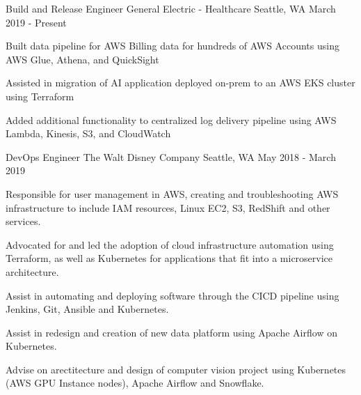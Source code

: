 

\begin{cventries}

  \cventry
    {Build and Release Engineer} %
    {General Electric - Healthcare} %
    {Seattle, WA} %
    {March 2019 - Present} %
    {
      \begin{cvitems} %
        \item {Built data pipeline for AWS Billing data for hundreds of AWS Accounts using AWS Glue, Athena, and QuickSight}
        \item {Assisted in migration of AI application deployed on-prem to an AWS EKS cluster using Terraform}
        \item {Added additional functionality to centralized log delivery pipeline using AWS Lambda, Kinesis, S3, and CloudWatch}
      \end{cvitems}
    }

  \cventry
    {DevOps Engineer} %
    {The Walt Disney Company} %
    {Seattle, WA} %
    {May 2018 - March 2019} %
    {
      \begin{cvitems} %
        \item {Responsible for user management in AWS, creating and troubleshooting AWS infrastructure to include IAM resources, Linux EC2, S3, RedShift and other services.}
        \item {Advocated for and led the adoption of cloud infrastructure automation using Terraform, as well as Kubernetes for applications that fit into a microservice architecture.}
        \item {Assist in automating and deploying software through the CICD pipeline using Jenkins, Git, Ansible and Kubernetes.}
        \item {Assist in redesign and creation of new data platform using Apache Airflow on Kubernetes.}
        \item {Advise on arectitecture and design of computer vision project using Kubernetes (AWS GPU Instance nodes), Apache Airflow and Snowflake.}
      \end{cvitems}
    }


\end{cventries}
